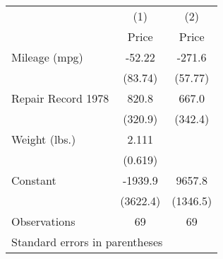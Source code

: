 \begin{tabular}{l*{2}{c}}
\hline\hline
                    &\multicolumn{1}{c}{(1)}&\multicolumn{1}{c}{(2)}\\
                    &\multicolumn{1}{c}{Price}&\multicolumn{1}{c}{Price}\\
\hline
Mileage (mpg)       &      -52.22&      -271.6\\
                    &     (83.74)&     (57.77)\\
[1em]
Repair Record 1978  &       820.8&       667.0\\
                    &     (320.9)&     (342.4)\\
[1em]
Weight (lbs.)       &       2.111&            \\
                    &     (0.619)&            \\
[1em]
Constant            &     -1939.9&      9657.8\\
                    &    (3622.4)&    (1346.5)\\
\hline
Observations        &          69&          69\\
\hline\hline
\multicolumn{3}{l}{\footnotesize Standard errors in parentheses}\\
\end{tabular}
